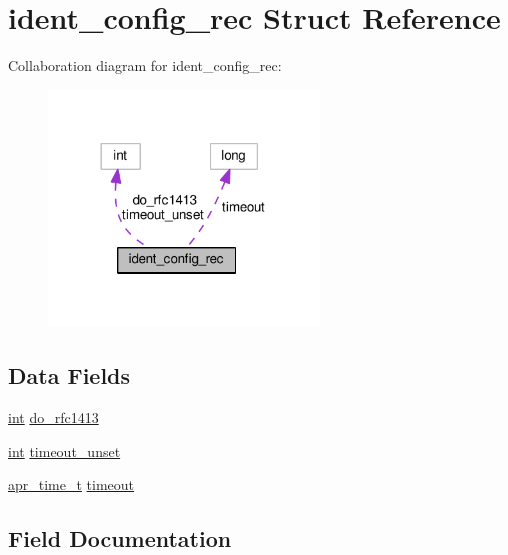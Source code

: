 \hypertarget{structident__config__rec}{}\section{ident\+\_\+config\+\_\+rec Struct Reference}
\label{structident__config__rec}


Collaboration diagram for ident\+\_\+config\+\_\+rec\+:
\nopagebreak
\begin{figure}[H]
\begin{center}
\leavevmode
\includegraphics[width=204pt]{structident__config__rec__coll__graph}
\end{center}
\end{figure}
\subsection*{Data Fields}
\begin{DoxyCompactItemize}
\item 
\hyperlink{pcre_8txt_a42dfa4ff673c82d8efe7144098fbc198}{int} \hyperlink{structident__config__rec_a75afac676f44f7025b662dbabeeb0623}{do\+\_\+rfc1413}
\item 
\hyperlink{pcre_8txt_a42dfa4ff673c82d8efe7144098fbc198}{int} \hyperlink{structident__config__rec_acadc2a62f1ab6952ae388fd336c66053}{timeout\+\_\+unset}
\item 
\hyperlink{group__apr__time_gadb4bde16055748190eae190c55aa02bb}{apr\+\_\+time\+\_\+t} \hyperlink{structident__config__rec_af6ba26eb2b2b341d00b06f447b8eb6fa}{timeout}
\end{DoxyCompactItemize}


\subsection{Field Documentation}

